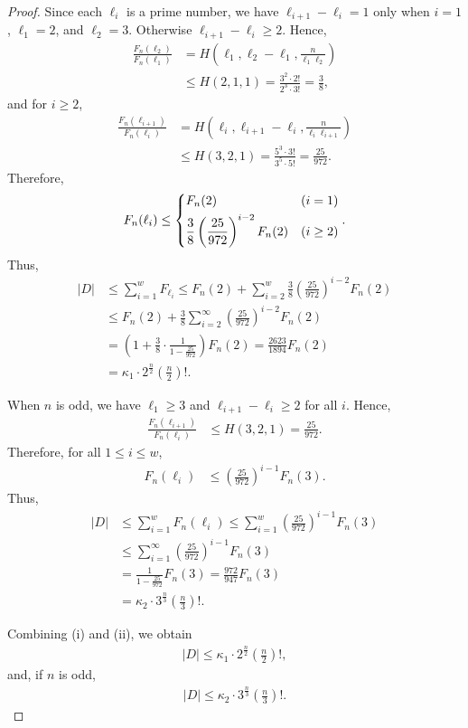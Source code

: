 \documentclass[12pt,reqno]{amsart}
\newcommand{\f}[2]{\frac{#1}{#2}}							%
\newcommand{\vt}[1]{\left\lvert #1 \right\rvert}					%
\theoremstyle{mythmstyle}
\theoremstyle{mydefstyle}
\numberwithin{equation}{section}
\begin{document}
\begin{proof}
Since each $\ell_{i}$ is a prime number, we have $\ell_{i+1} - \ell_{i} = 1$ only when $i = 1$, $\ell_{1} = 2$, and
$\ell_{2} = 3$. Otherwise $\ell_{i+1} - \ell_{i} \ge 2$. Hence,
\begin{align}
\f{F_{n}(\ell_{2})}{F_{n}(\ell_{1})} &= H\left(\ell_{1}, \ell_{2}-\ell_{1}, \f{n}{\ell_{1}\ell_{2}}\right) \\
&\le H(2, 1, 1) = \f{3^{2}\cdot 2!}{2^{3}\cdot 3!} = \f{3}{8},
\end{align}
and for $i \ge 2$,
\begin{align}
\f{F_{n}(\ell_{i+1})}{F_{n}(\ell_{i})} &= H\left(\ell_{i}, \ell_{i+1}-\ell_{i}, \f{n}{\ell_{i}\ell_{i+1}}\right) \\
&\le H(3, 2, 1) = \f{5^{3}\cdot 3!}{3^{5}\cdot 5!} = \f{25}{972}.
\end{align}
Therefore,
\begin{align}
F_{n}(\ell_{i}) \le
\begin{dcases}
F_{n}(2) & (i = 1) \\
\f{3}{8}\left(\f{25}{972}\right)^{i-2}F_{n}(2) & (i \ge 2)
\end{dcases}.
\end{align}
Thus,
\begin{align}
\vt{D} &\le \sum_{i=1}^{w}F_{\ell_{i}} \le F_{n}(2) + \sum_{i=2}^{w}\f{3}{8}\left(\f{25}{972}\right)^{i-2}F_{n}(2) \\
&\le F_{n}(2) + \f{3}{8}\sum_{i=2}^{\infty}\left(\f{25}{972}\right)^{i-2}F_{n}(2) \\
&= \left(1 + \f{3}{8}\cdot\f{1}{1-\f{25}{972}}\right)F_{n}(2) = \f{2623}{1894}F_{n}(2) \\
&= \kappa_{1}\cdot 2^{\f{n}{2}}\left(\f{n}{2}\right)!.
\end{align}

When $n$ is odd, we have $\ell_{1} \ge 3$ and $\ell_{i+1} - \ell_{i} \ge 2$ for all $i$. Hence,
\begin{align}
\f{F_{n}(\ell_{i+1})}{F_{n}(\ell_{i})} &\le H(3, 2, 1) =  \f{25}{972}.
\end{align}
Therefore, for all $1 \le i \le w$,
\begin{align}
F_{n}(\ell_{i}) &\le \left(\f{25}{972}\right)^{i-1}F_{n}(3).
\end{align}
Thus,
\begin{align}
\vt{D} &\le \sum_{i=1}^{w}F_{n}(\ell_{i}) \le \sum_{i=1}^{w}\left(\f{25}{972}\right)^{i-1}F_{n}(3) \\
&\le \sum_{i=1}^{\infty}\left(\f{25}{972}\right)^{i-1}F_{n}(3) \\
&= \f{1}{1-\f{25}{972}}F_{n}(3) = \f{972}{947}F_{n}(3) \\
&= \kappa_{2}\cdot 3^{\f{n}{3}}\left(\f{n}{3}\right)!.
\end{align}

Combining (i) and (ii), we obtain
\begin{align}
\vt{D} \le \kappa_{1}\cdot 2^{\f{n}{2}}\left(\f{n}{2}\right)!,
\end{align}
and, if $n$ is odd,
\begin{align}
\vt{D} \le \kappa_{2}\cdot 3^{\f{n}{3}}\left(\f{n}{3}\right)!.
\end{align}
\end{proof}
\end{document}
